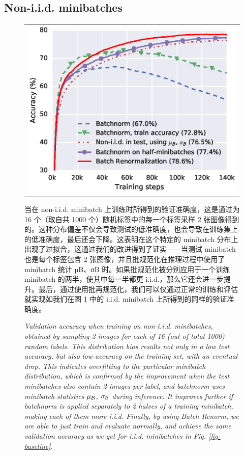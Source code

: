 \subsection{Non-i.i.d. minibatches}
\begin{figure}[t]
    \centering
    \begin{tabular}{@{}c@{}}
\includegraphics[width=\columnwidth]{biased.eps}
\end{tabular}
    当在 non-i.i.d. minibatch 上训练时所得到的验证准确度，这是通过为 16 个（取自共 1000 个）随机标签中的每一个标签采样 2 张图像得到的。这种分布偏差不仅会导致测试的低准确度，也会导致在训练集上的低准确度，最后还会下降。这表明在这个特定的 minibatch 分布上出现了过拟合，这通过我们的改进得到了证实——当测试 minibatch 也是每个标签包含 2 张图像，并且批规范化在推理过程中使用了 minibatch 统计 µB、σB 时。如果批规范化被分别应用于一个训练 minibatch 的两半，使其中每一半都更 i.i.d.，那么它还会进一步提升。最后，通过使用批再规范化，我们可以仅通过正常的训练和评估就实现如我们在图 1 中的 i.i.d. minibatch 上所得到的同样的验证准确度。
    \caption{\em Validation accuracy when training on non-i.i.d. minibatches, obtained by sampling 2 images for each of 16 (out of total 1000) random labels. This distribution bias results not only in a low test accuracy, but also low accuracy on the training set, with an eventual drop. This indicates overfitting to the particular minibatch distribution, which is confirmed by the improvement when the test minibatches also contain 2 images per label, and batchnorm uses minibatch statistics $\mu_{\mathcal{B}}$, $\sigma_{\mathcal{B}}$ during inference. It improves further if batchnorm is applied separately to 2 halves of a training minibatch, making each of them more i.i.d. Finally, by using Batch Renorm, we are able to just train and evaluate normally, and achieve the same validation accuracy as we get for i.i.d. minibatches in Fig. \ref{fig-baseline}.
    }
    \label{fig-biased}
\end{figure}

